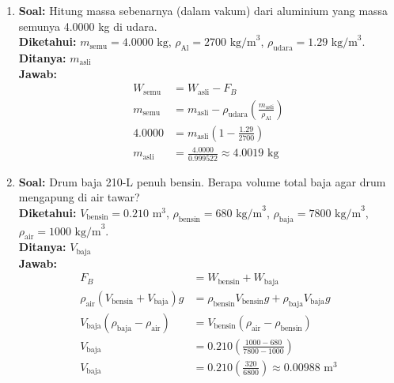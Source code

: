 \documentclass[twocolumn]{article}
\begin{document}
\begin{enumerate}
    \item \textbf{Soal:} Hitung massa sebenarnya (dalam vakum) dari aluminium yang massa semunya 4.0000 kg di udara. \\
    \textbf{Diketahui:} $m_{\text{semu}} = 4.0000 \text{ kg}$, $\rho_{\text{Al}} = 2700 \text{ kg/m}^3$, $\rho_{\text{udara}} = 1.29 \text{ kg/m}^3$. \\
    \textbf{Ditanya:} $m_{\text{asli}}$ \\
    \textbf{Jawab:}
    \begin{align*}
        W_{\text{semu}} &= W_{\text{asli}} - F_B \\
        m_{\text{semu}} &= m_{\text{asli}} - \rho_{\text{udara}} \left( \frac{m_{\text{asli}}}{\rho_{\text{Al}}} \right) \\
        4.0000 &= m_{\text{asli}} \left( 1 - \frac{1.29}{2700} \right) \\
        m_{\text{asli}} &= \frac{4.0000}{0.999522} \approx 4.0019 \text{ kg}
    \end{align*}

    \item \textbf{Soal:} Drum baja 210-L penuh bensin. Berapa volume total baja agar drum mengapung di air tawar? \\
    \textbf{Diketahui:} $V_{\text{bensin}} = 0.210 \text{ m}^3$, $\rho_{\text{bensin}} = 680 \text{ kg/m}^3$, $\rho_{\text{baja}} = 7800 \text{ kg/m}^3$, $\rho_{\text{air}} = 1000 \text{ kg/m}^3$. \\
    \textbf{Ditanya:} $V_{\text{baja}}$ \\
    \textbf{Jawab:}
    \begin{align*}
        F_B &= W_{\text{bensin}} + W_{\text{baja}} \\
        \rho_{\text{air}} (V_{\text{bensin}} + V_{\text{baja}}) g &= \rho_{\text{bensin}} V_{\text{bensin}} g + \rho_{\text{baja}} V_{\text{baja}} g \\
        V_{\text{baja}} (\rho_{\text{baja}} - \rho_{\text{air}}) &= V_{\text{bensin}} (\rho_{\text{air}} - \rho_{\text{bensin}}) \\
        V_{\text{baja}} &= 0.210 \left( \frac{1000 - 680}{7800 - 1000} \right) \\
        V_{\text{baja}} &= 0.210 \left( \frac{320}{6800} \right) \approx 0.00988 \text{ m}^3
    \end{align*}


\end{enumerate}
\end{document}

